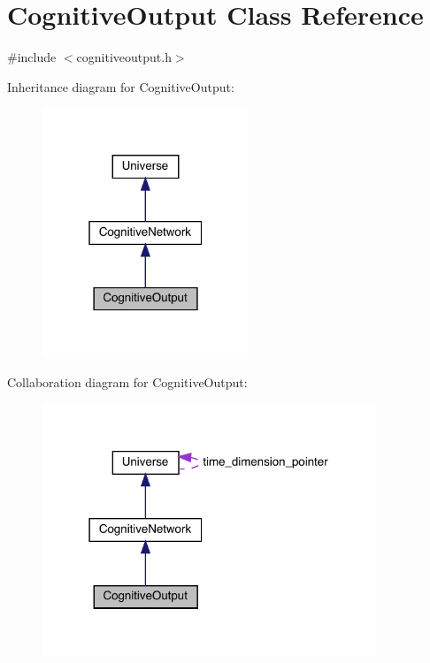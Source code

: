 \hypertarget{class_cognitive_output}{}\section{Cognitive\+Output Class Reference}
\label{class_cognitive_output}


{\ttfamily \#include $<$cognitiveoutput.\+h$>$}



Inheritance diagram for Cognitive\+Output\+:\nopagebreak
\begin{figure}[H]
\begin{center}
\leavevmode
\includegraphics[width=175pt]{class_cognitive_output__inherit__graph}
\end{center}
\end{figure}


Collaboration diagram for Cognitive\+Output\+:\nopagebreak
\begin{figure}[H]
\begin{center}
\leavevmode
\includegraphics[width=283pt]{class_cognitive_output__coll__graph}
\end{center}
\end{figure}
